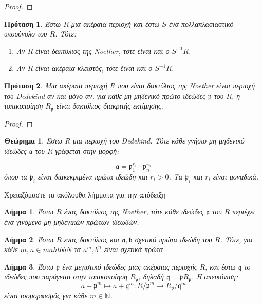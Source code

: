 \documentclass[oneside,a4paper]{article}
\newtheorem{theorem}{Θεώρημα}
\newtheorem{lemma}{Λήμμα}
\newtheorem{prop}{Πρόταση}
\newcommand {\tl}{\textlatin}
\begin{document}
\begin{proof}
\end{proof}

\begin{prop}
	Έστω $R$ μια ακέραια περιοχή και έστω $S$ ένα πολλαπλασιαστικό υποσύνολο του $R$. Τότε:
	\begin{enumerate}
		\item Αν $R$ είναι δακτύλιος της \tl{Noether}, τότε είναι και ο $S^{-1} R$.
		\item Αν $R$ είναι ακέραια κλειστός, τότε έιναι και ο $S^{-1}R$.
	\end{enumerate}
\end{prop}


\begin{prop}
	Μια ακέραια περιοχή $R$ που είναι δακτύλιος της \tl{Noether} είναι περιοχή του \tl{Dedekind} αν και μόνο αν, για κάθε μη μηδενικό πρώτο ιδεώδες $\mathfrak{p}$ του $R$, η τοπικοποίηση $R_{\mathfrak{p}}$ είναι δακτύλιος διακριτής εκτίμησης.
\end{prop}

\begin{proof}
\end{proof}



\begin{theorem}
	Έστω $R$ μια περιοχή του \tl{Dedekind}. Τότε κάθε γνήσιο μη μηδενικό ιδεώδες $\mathfrak{a}$ του $R$ γράφεται στην μορφή:

	$$\mathfrak{a} = \mathfrak{p}^{r_1}_1 \cdots \mathfrak{p}^{r_n}_n $$ όπου τα $\mathfrak{p}_i$ είναι διακεκριμένα πρώτα ιδεώδη και $r_i >0$. Τα $\mathfrak{p}_i$ και $r_i$ είναι μοναδικά.
\end{theorem}

Χρειαζόμαστε τα ακόλουθα λήμματα για την απόδειξη

\begin{lemma}
	Έστω $R$ ένας δακτύλιος της \tl{Noether}, τότε κάθε ιδεώδες $\mathfrak{a}$ του $R$ περιέχει ένα γινόμενο μη μηδενικών πρώτων ιδεωδών.
\end{lemma}

\begin{lemma}
	Έστω $R$ ενας δακτύλιος και $\mathfrak{a},\mathfrak{b}$ σχετικά πρώτα ιδεώδη του $R$. Τότε, για κάθε $m,n \in mahtbb{N}$ τα $a^m, b^n$ είναι σχετικά πρώτα
\end{lemma}

\begin{lemma}
	Έστω $\mathfrak{p}$ ένα μεγιστικό ιδεώδες μιας ακέραιας περιοχής $R$, και έστω $\mathfrak{q}$ το ιδεώδες που παράγεται στην τοπικοποίηση $R_{\mathfrak{p}}$, δηλαδή $\mathfrak{q} = \mathfrak{p} R_{\mathfrak{p}}$. Η απεικόνιση:
	$$a + \mathfrak{p}^m \mapsto a + \mathfrak{q}^m : R/\mathfrak{p}^m \rightarrow R_{\mathfrak{p}} / \mathfrak{q}^m$$
	είναι ισομορφισμός για κάθε $m \in \mathbb{N}$.
\end{lemma}
\end{document}
